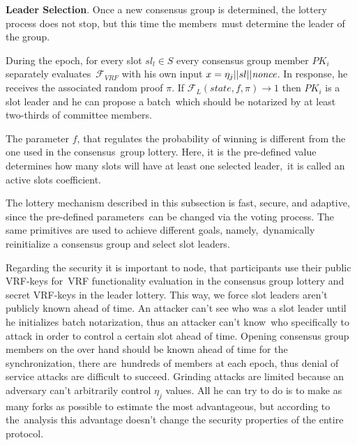 \textbf{Leader Selection}.
Once a new consensus group is determined, the lottery process does not stop, but this time the members\
must determine the leader of the group.

During the epoch, for every slot ${sl_l \in S}$ every consensus group member $PK_i$ separately evaluates\
${\mathcal{F}}_{VRF}$ with his own input ${x = \eta_j || sl || \emph{nonce}}$.
In response, he receives the associated random proof $\pi$.
If ${\mathcal{F}}_{L}(state, f, \pi) \rightarrow 1$ then $PK_i$ is a slot leader and he can propose a batch\
which should be notarized by at least two-thirds of committee members.

The parameter $f$, that regulates the probability of winning is different from the one used in the consensus\
group lottery.
Here, it is the pre-defined value determines how many slots will have at least one selected leader,\
it is called an active slots coefficient.

The lottery mechanism described in this subsection is fast, secure, and adaptive, since the pre-defined parameters\
can be changed via the voting process.
The same primitives are used to achieve different goals, namely,\
dynamically reinitialize a consensus group and select slot leaders.

Regarding the security it is important to node, that participants use their public VRF-keys for\
VRF functionality evaluation in the consensus group lottery and secret VRF-keys in the leader lottery.
This way, we force slot leaders aren't publicly known ahead of time.
An attacker can't see who was a slot leader until he initializes batch notarization, thus an attacker can't know\
who specifically to attack in order to control a certain slot ahead of time.
Opening consensus group members on the over hand should be known ahead of time for the synchronization, there are\
hundreds of members at each epoch, thus denial of service attacks are difficult to succeed.
Grinding attacks are limited because an adversary can't arbitrarily control $\eta_j$ values.
All he can try to do is to make as many forks as possible to estimate the most advantageous, but according to the\
analysis this advantage doesn't change the security properties of the entire protocol.

